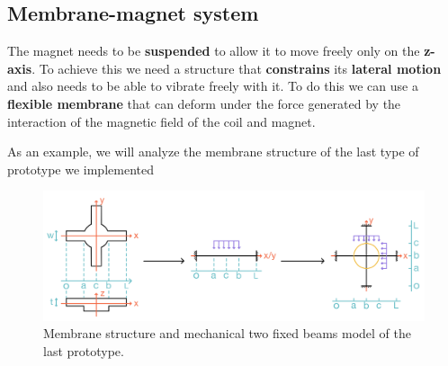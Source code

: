 \subsection{Membrane-magnet system}
\label{sec: Membrane-magnet_system}

The magnet needs to be \textbf{suspended} to allow it to move freely only on the \textbf{z-axis}.
To achieve this we need a structure that \textbf{constrains} its \textbf{lateral motion} and also needs to be able to vibrate freely with it.
To do this we can use a \textbf{flexible membrane} that can deform under the force generated by the interaction of the magnetic field of the coil and magnet. 

\begin{samepage}
    As an example, we will analyze the membrane structure of the last type of prototype we implemented %
    \nopagebreak

    \begin{figure}[H]
        \centering
        \includegraphics[width=0.9\linewidth]{Chapters/Chapter2/Modelling_of_Entire_System/Figures/membr_mech_model.jpg} 
        \caption[Membrane structure]{Membrane structure and mechanical two fixed beams model of the last prototype.}
        \label{fig: Membrane_structure}
    \end{figure}
\end{samepage}

